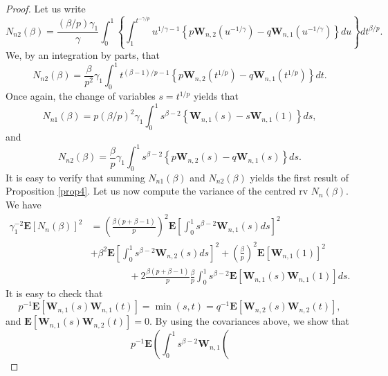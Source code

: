 \documentclass[reqno,openbib,runningheads,a4paper,12pt]{amsart}%
\begin{document}
\begin{proof}
Let us write
\[
N_{n2}\left(  \beta\right)  =\frac{\left(  \beta/p\right)  \gamma_{1}}{\gamma
}\int_{0}^{1}\left\{
{\displaystyle\int_{1}^{t^{-\gamma/p}}}
u^{1/\gamma-1}\left\{  p\mathbf{W}_{n,2}\left(  u^{-1/\gamma}\right)
-q\mathbf{W}_{n,1}\left(  u^{-1/\gamma}\right)  \right\}  du\right\}
dt^{\beta/p}.
\]
We, by an integration by parts, that%
\[
N_{n2}\left(  \beta\right)  =\frac{\beta}{p^{2}}\gamma_{1}\int_{0}%
^{1}t^{\left(  \beta-1\right)  /p-1}\left\{  p\mathbf{W}_{n,2}\left(
t^{1/p}\right)  -q\mathbf{W}_{n,1}\left(  t^{1/p}\right)  \right\}  dt.
\]
Once again, the change of variables $s=t^{1/p}$ yields that%
\[
N_{n1}\left(  \beta\right)  =p\left(  \beta/p\right)  ^{2}\gamma_{1}\int%
_{0}^{1}s^{\beta-2}\left\{  \mathbf{W}_{n,1}\left(  s\right)  -s\mathbf{W}%
_{n,1}\left(  1\right)  \right\}  ds,
\]
and%
\[
N_{n2}\left(  \beta\right)  =\frac{\beta}{p}\gamma_{1}\int_{0}^{1}s^{\beta
-2}\left\{  p\mathbf{W}_{n,2}\left(  s\right)  -q\mathbf{W}_{n,1}\left(
s\right)  \right\}  ds.
\]
It is easy to verify that summing $N_{n1}\left(  \beta\right)  $ and
$N_{n2}\left(  \beta\right)  $ yields the first result of Proposition
\ref{prop4}. Let us now compute the variance of the centred rv $N_{n}\left(
\beta\right)  .$ We have%
\begin{align*}
\gamma_{1}^{-2}\mathbf{E}\left[  N_{n}\left(  \beta\right)  \right]  ^{2}  &
=\left(  \frac{\beta\left(  p+\beta-1\right)  }{p}\right)  ^{2}\mathbf{E}%
\left[  \int_{0}^{1}s^{\beta-2}\mathbf{W}_{n,1}\left(  s\right)  ds\right]
^{2}\\
&  +\beta^{2}\mathbf{E}\left[  \int_{0}^{1}s^{\beta-2}\mathbf{W}_{n,2}\left(
s\right)  ds\right]  ^{2}+\left(  \frac{\beta}{p}\right)  ^{2}\mathbf{E}%
\left[  \mathbf{W}_{n,1}\left(  1\right)  \right]  ^{2}\\
&  \ \ \ \ \ \ \ \ \ \ \ \ \ \ \ \ \ \ +2\frac{\beta\left(  p+\beta-1\right)
}{p}\frac{\beta}{p}\int_{0}^{1}s^{\beta-2}\mathbf{E}\left[  \mathbf{W}%
_{n,1}\left(  s\right)  \mathbf{W}_{n,1}\left(  1\right)  \right]  ds.
\end{align*}
It is easy to check that%
\[
p^{-1}\mathbf{E}\left[  \mathbf{W}_{n,1}\left(  s\right)  \mathbf{W}%
_{n,1}\left(  t\right)  \right]  =\min\left(  s,t\right)  =q^{-1}%
\mathbf{E}\left[  \mathbf{W}_{n,2}\left(  s\right)  \mathbf{W}_{n,2}\left(
t\right)  \right]  ,
\]
and $\mathbf{E}\left[  \mathbf{W}_{n,1}\left(  s\right)  \mathbf{W}%
_{n,2}\left(  t\right)  \right]  =0.$ By using the covariances above, we show
that%
\[
p^{-1}\mathbf{E}\left(  \int_{0}^{1}s^{\beta-2}\mathbf{W}_{n,1}\left(
\]
\end{proof}
\end{document}
